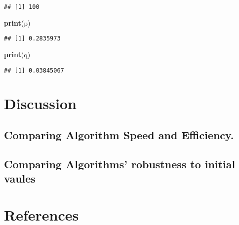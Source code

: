 \documentclass[]{article}
\newenvironment{Shaded}{\begin{snugshade}}{\end{snugshade}}
\newcommand{\KeywordTok}[1]{\textcolor[rgb]{0.13,0.29,0.53}{\textbf{#1}}}
\newcommand{\NormalTok}[1]{#1}
\begin{document}
\begin{verbatim}
## [1] 100
\end{verbatim}

\begin{Shaded}
\begin{Highlighting}[]
\KeywordTok{print}\NormalTok{(p)}
\end{Highlighting}
\end{Shaded}

\begin{verbatim}
## [1] 0.2835973
\end{verbatim}

\begin{Shaded}
\begin{Highlighting}[]
\KeywordTok{print}\NormalTok{(q)}
\end{Highlighting}
\end{Shaded}

\begin{verbatim}
## [1] 0.03845067
\end{verbatim}

\section{Discussion}\label{discussion}

\subsection{Comparing Algorithm Speed and
Efficiency.}\label{comparing-algorithm-speed-and-efficiency.}

\subsection{Comparing Algorithms' robustness to initial
vaules}\label{comparing-algorithms-robustness-to-initial-vaules}

\section{References}\label{references}
\end{document}
